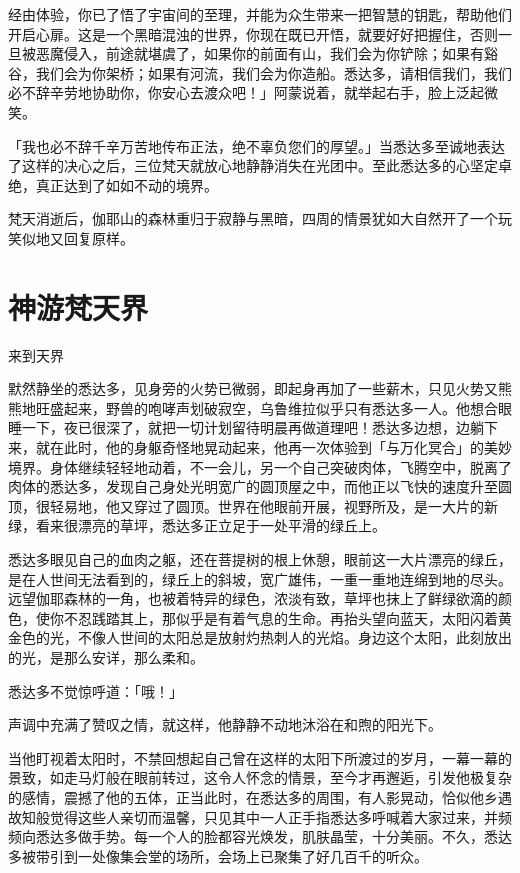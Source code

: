 \documentclass[12pt,twoside,openany]{book}
\begin{document}
经由体验，你已了悟了宇宙间的至理，并能为众生带来一把智慧的钥匙，帮助他们开启心扉。这是一个黑暗混浊的世界，你现在既已开悟，就要好好把握住，否则一旦被恶魔侵入，前途就堪虞了，如果你的前面有山，我们会为你铲除；如果有谿谷，我们会为你架桥；如果有河流，我们会为你造船。悉达多，请相信我们，我们必不辞辛劳地协助你，你安心去渡众吧！」阿蒙说着，就举起右手，脸上泛起微笑。

「我也必不辞千辛万苦地传布正法，绝不辜负您们的厚望。」当悉达多至诚地表达了这样的决心之后，三位梵天就放心地静静消失在光团中。至此悉达多的心坚定卓绝，真正达到了如如不动的境界。

梵天消逝后，伽耶山的森林重归于寂静与黑暗，四周的情景犹如大自然开了一个玩笑似地又回复原样。

\section{神游梵天界}\label{sec1.18}

来到天界

默然静坐的悉达多，见身旁的火势已微弱，即起身再加了一些薪木，只见火势又熊熊地旺盛起来，野兽的咆哮声划破寂空，乌鲁维拉似乎只有悉达多一人。他想合眼睡一下，夜已很深了，就把一切计划留待明晨再做道理吧！悉达多边想，边躺下来，就在此时，他的身躯奇怪地晃动起来，他再一次体验到「与万化冥合」的美妙境界。身体继续轻轻地动着，不一会儿，另一个自己突破肉体，飞腾空中，脱离了肉体的悉达多，发现自己身处光明宽广的圆顶屋之中，而他正以飞快的速度升至圆顶，很轻易地，他又穿过了圆顶。世界在他眼前开展，视野所及，是一大片的新绿，看来很漂亮的草坪，悉达多正立足于一处平滑的绿丘上。

悉达多眼见自己的血肉之躯，还在菩提树的根上休憩，眼前这一大片漂亮的绿丘，是在人世间无法看到的，绿丘上的斜坡，宽广雄伟，一重一重地连绵到地的尽头。远望伽耶森林的一角，也被着特异的绿色，浓淡有致，草坪也抹上了鲜绿欲滴的颜色，使你不忍践踏其上，那似乎是有着气息的生命。再抬头望向蓝天，太阳闪着黄金色的光，不像人世间的太阳总是放射灼热刺人的光焰。身边这个太阳，此刻放出的光，是那么安详，那么柔和。

悉达多不觉惊呼道：「哦！」

声调中充满了赞叹之情，就这样，他静静不动地沐浴在和煦的阳光下。

当他盯视着太阳时，不禁回想起自己曾在这样的太阳下所渡过的岁月，一幕一幕的景致，如走马灯般在眼前转过，这令人怀念的情景，至今才再邂逅，引发他极复杂的感情，震撼了他的五体，正当此时，在悉达多的周围，有人影晃动，恰似他乡遇故知般觉得这些人亲切而温馨，只见其中一人正手指悉达多呼喊着大家过来，并频频向悉达多做手势。每一个人的脸都容光焕发，肌肤晶莹，十分美丽。不久，悉达多被带引到一处像集会堂的场所，会场上已聚集了好几百千的听众。
\end{document}
